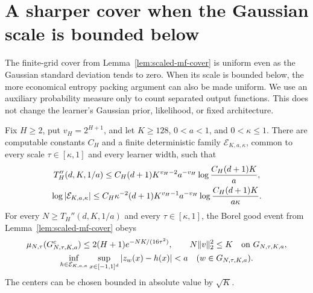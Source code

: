 \section{A sharper cover when the Gaussian scale is bounded below}
\label{sec:truncated-scale-mass-cover}

The finite-grid cover from Lemma~\ref{lem:scaled-mf-cover} is uniform
even as the Gaussian standard deviation tends to zero.  When its scale
is bounded below, the more economical entropy packing argument can
also be made uniform.  We use an auxiliary probability measure only
to count separated output functions.  This does not change the
learner's Gaussian prior, likelihood, or fixed architecture.

\begin{lemma}
\label{lem:truncated-scale-cover}
Fix $H\geq2$, put $v_H=2^{H+1}$, and let
$K\geq128$, $0<a<1$, and $0<\kappa\leq1$.
There are computable constants $C_H$ and a finite deterministic family
$\mathcal E_{K,a,\kappa}$, common to every scale
$\tau\in[\kappa,1]$ and every learner width, such that
\begin{gather}
 T_H''(d,K,1/a)\leq
 C_H(d+1)K^{v_H-2}a^{-v_H}
                      \log\frac{C_H(d+1)K}{a},\notag\\
 \log|\mathcal E_{K,a,\kappa}|\leq
 C_H\kappa^{-2}(d+1)K^{v_H-1}a^{-v_H}
                      \log\frac{C_H(d+1)K}{a\kappa}.
 \label{eq:truncated-scale-cover-bounds}
\end{gather}
For every $N\geq T_H''(d,K,1/a)$ and every
$\tau\in[\kappa,1]$, the Borel good event from
Lemma~\ref{lem:scaled-mf-cover} obeys
\begin{gather*}
 \mu_{N,\tau}(G_{N,\tau,K,a}^c)
       \leq2(H+1)e^{-NK/(16\tau^2)},\qquad
 N\|v\|_2^2\leq K\quad\hbox{on }G_{N,\tau,K,a},\\
 \inf_{h\in\mathcal E_{K,a,\kappa}}
          \sup_{x\in[-1,1]^d}|z_w(x)-h(x)|<a
             \quad(w\in G_{N,\tau,K,a}).
\end{gather*}
The centers can be chosen bounded in absolute value by $\sqrt K$.
\end{lemma}
